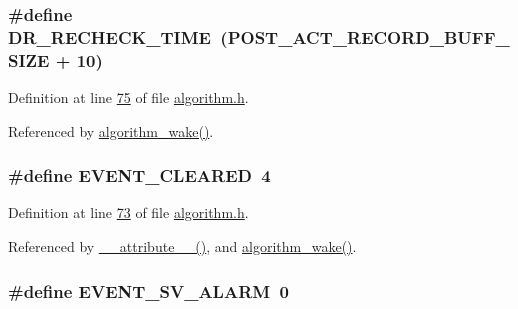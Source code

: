 \hypertarget{a00021_afb154043998a164232751d1c030e8650}{
\subsubsection[{D\+R\+\_\+\+R\+E\+C\+H\+E\+C\+K\+\_\+\+T\+I\+M\+E}]{\setlength{\rightskip}{0pt plus 5cm}\#define D\+R\+\_\+\+R\+E\+C\+H\+E\+C\+K\+\_\+\+T\+I\+M\+E~({\bf P\+O\+S\+T\+\_\+\+A\+C\+T\+\_\+\+R\+E\+C\+O\+R\+D\+\_\+\+B\+U\+F\+F\+\_\+\+S\+I\+Z\+E} + 10)}}\label{a00021_afb154043998a164232751d1c030e8650}


Definition at line \hyperlink{a00021_source_l00075}{75} of file \hyperlink{a00021_source}{algorithm.\+h}.



Referenced by \hyperlink{a00038_source_l00670}{algorithm\+\_\+wake()}.

\hypertarget{a00021_a602c125746b241f3a37e9fd5f43412b0}{
\subsubsection[{E\+V\+E\+N\+T\+\_\+\+C\+L\+E\+A\+R\+E\+D}]{\setlength{\rightskip}{0pt plus 5cm}\#define E\+V\+E\+N\+T\+\_\+\+C\+L\+E\+A\+R\+E\+D~4}}\label{a00021_a602c125746b241f3a37e9fd5f43412b0}


Definition at line \hyperlink{a00021_source_l00073}{73} of file \hyperlink{a00021_source}{algorithm.\+h}.



Referenced by \hyperlink{a00041_source_l00025}{\+\_\+\+\_\+attribute\+\_\+\+\_\+()}, and \hyperlink{a00038_source_l00670}{algorithm\+\_\+wake()}.

\hypertarget{a00021_a0cec8cae6d70499e62b4251e5843497d}{
\subsubsection[{E\+V\+E\+N\+T\+\_\+\+S\+V\+\_\+\+A\+L\+A\+R\+M}]{\setlength{\rightskip}{0pt plus 5cm}\#define E\+V\+E\+N\+T\+\_\+\+S\+V\+\_\+\+A\+L\+A\+R\+M~0}}\label{a00021_a0cec8cae6d70499e62b4251e5843497d}


